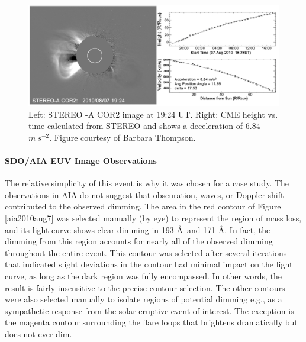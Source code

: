 \begin{figure}[!h]
	\caption[LASCO coronagraph data for 2010 August 7 event]{
        Left: STEREO -A COR2 image at 19:24 UT. Right: CME height vs. time calculated from STEREO and shows a deceleration
        of 6.84 $m\ s^{-2}$. Figure courtesy of Barbara Thompson. 
	}
    \begin{center}
	    \includegraphics[width=150mm]{Images/Stereo2010Aug7Cme.png}
    \end{center}
    \label{stereo2010aug7}
\end{figure}

\paragraph{SDO/AIA EUV Image Observations}
The relative simplicity of this event is why it was chosen for a case study. The observations in AIA do not suggest that obscuration, waves, or Doppler shift contributed to the observed dimming. The area in the red contour of Figure \ref{aia2010aug7} was selected manually (by eye) to represent the region of mass loss, and its light curve shows clear dimming in 193 \AA\ and 171 \AA. In fact, the dimming from this region accounts for nearly all of the observed dimming throughout the entire event. This contour was selected after several iterations that indicated slight deviations in the contour had minimal impact on the light curve, as long as the dark region was fully encompassed. In other words, the result is fairly insensitive to the precise contour selection. The other contours were also selected manually to isolate regions of potential dimming e.g., as a sympathetic response from the solar eruptive event of interest. The exception is the magenta contour surrounding the flare loops that brightens dramatically but does not ever dim. 

